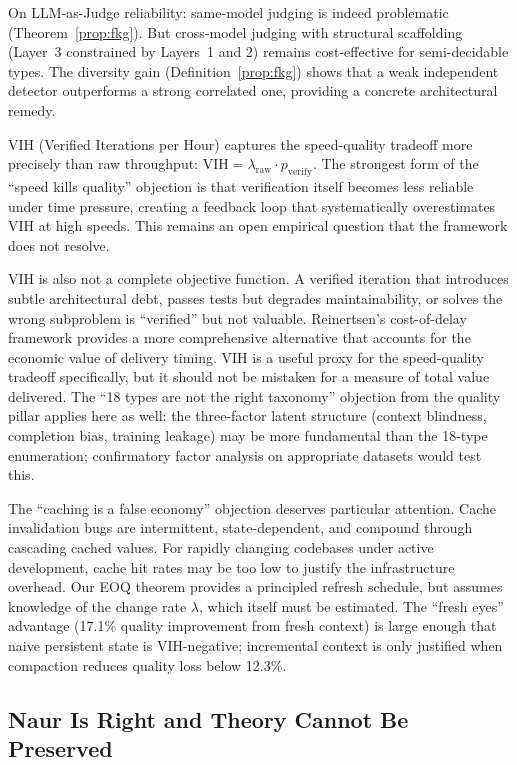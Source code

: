 \documentclass[11pt, a4paper]{googledeepmind}
\newcommand{\VIH}{\text{VIH}}
\begin{document}
On LLM-as-Judge reliability: same-model judging is indeed problematic (Theorem~\ref{prop:fkg}). But cross-model judging with structural scaffolding (Layer~3 constrained by Layers~1 and 2) remains cost-effective for semi-decidable types. The diversity gain (Definition~\ref{prop:fkg}) shows that a weak independent detector outperforms a strong correlated one, providing a concrete architectural remedy.

VIH (Verified Iterations per Hour) captures the speed-quality tradeoff more precisely than raw throughput: $\VIH = \lambda_{\mathrm{raw}} \cdot p_{\mathrm{verify}}$. The strongest form of the ``speed kills quality'' objection is that verification itself becomes less reliable under time pressure, creating a feedback loop that systematically overestimates VIH at high speeds. This remains an open empirical question that the framework does not resolve.

VIH is also not a complete objective function. A verified iteration that introduces subtle architectural debt, passes tests but degrades maintainability, or solves the wrong subproblem is ``verified'' but not valuable. Reinertsen's cost-of-delay framework provides a more comprehensive alternative that accounts for the economic value of delivery timing. VIH is a useful proxy for the speed-quality tradeoff specifically, but it should not be mistaken for a measure of total value delivered. The ``18 types are not the right taxonomy'' objection from the quality pillar applies here as well: the three-factor latent structure (context blindness, completion bias, training leakage) may be more fundamental than the 18-type enumeration; confirmatory factor analysis on appropriate datasets would test this.

The ``caching is a false economy'' objection deserves particular attention. Cache invalidation bugs are intermittent, state-dependent, and compound through cascading cached values. For rapidly changing codebases under active development, cache hit rates may be too low to justify the infrastructure overhead. Our EOQ theorem provides a principled refresh schedule, but assumes knowledge of the change rate $\lambda$, which itself must be estimated. The ``fresh eyes'' advantage (17.1\% quality improvement from fresh context) is large enough that naive persistent state is VIH-negative; incremental context is only justified when compaction reduces quality loss below 12.3\%.


\subsection{Naur Is Right and Theory Cannot Be Preserved}
\label{sec:contrarian-naur}
\end{document}

